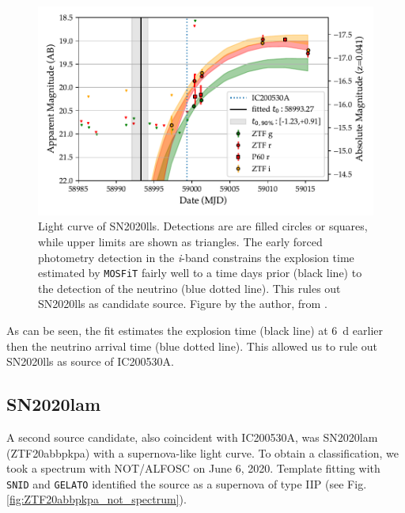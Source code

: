 \documentclass[
    a4paper, %
    fontsize=10pt, %
    twoside=true, %
    numbers=noenddot, %
    fontmethod=tex,
]{kaobook}
\begin{document}
\begin{figure}[h!]
    \includegraphics[width=1\textwidth]{fu/ZTF20abdnpdo_mosfit.pdf}
    \caption[SN2020lls light curve fit]{Light curve of SN2020lls. Detections are are filled circles or squares, while upper limits are shown as triangles. The early forced photometry detection in the \textit{i}-band constrains the explosion time estimated by \texttt{MOSFiT} fairly well to a time days prior (black line) to the detection of the neutrino (blue dotted line). This rules out SN2020lls as candidate source. Figure by the author, from \cite{Stein2023a}.}
\end{figure}
As can be seen, the fit estimates the explosion time (black line) at \SI{6}{\day} earlier then the neutrino arrival time (blue dotted line). This allowed us to rule out SN2020lls as source of IC200530A.

\subsection{SN2020lam}
A second source candidate, also coincident with IC200530A, was SN2020lam (ZTF20abbpkpa)  with a supernova-like light curve. To obtain a classification, we took a spectrum with NOT/ALFOSC on June 6, 2020. Template fitting with \texttt{SNID} and \texttt{GELATO}  identified the source as a supernova of type IIP (see Fig. \ref{fig:ZTF20abbpkpa_not_spectrum}).
\end{document}
